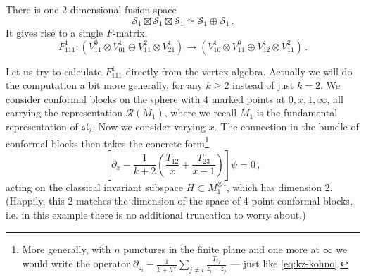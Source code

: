 \documentclass[12pt,letterpaper,reqno]{amsart}
\numberwithin{equation}{section}
\newcommand{\fsl}{{\mathfrak {sl}}}
\newcommand{\cS}{\ensuremath{\mathcal S}}
\newcommand{\vrep}{\mathcal{R}}
\begin{document}
\begin{example}
There is one 2-dimensional fusion space 
\begin{equation}
 \cS_1 \boxtimes \cS_1 \boxtimes \cS_1 \simeq \cS_1 \oplus \cS_1 \, . 
\end{equation}
It gives rise to a single $F$-matrix,
\begin{equation}
 F_{111}^1: (V_{11}^{0} \otimes V_{01}^1 \oplus V_{11}^2 \otimes V_{21}^1) \to (V_{10}^{1} \otimes V_{11}^0 \oplus V_{12}^1 \otimes V_{11}^2) \, .
\end{equation}

Let us try to calculate $F_{111}^1$ directly from the vertex algebra.
Actually we 
will do the computation a bit more generally, for any $k \ge 2$ instead
of just $k=2$.
We consider conformal blocks on the sphere with 4 marked points at
$0, x, 1, \infty$,
all carrying the representation $\vrep(M_1)$, where we recall $M_1$
is the fundamental representation of $\fsl_2$.
Now we consider varying $x$.
The connection in the bundle of conformal blocks then
takes the concrete form\footnote{More generally, with $n$ punctures in
the finite plane and one more at $\infty$ we would write the operator $\partial_{z_i} - \frac{1}{k + h^\vee} \sum_{j \neq i} \frac{T_{ij}}{z_i - z_j}$ --- just like \eqref{eq:kz-kohno}.}
\begin{equation} \label{eq:kz-4-punctures}
  \left[  \partial_{x} - \frac{1}{k+2} \left(  \frac{T_{12}}{x} + \frac{T_{23}}{x-1} \right) \right] \psi = 0 \, ,
\end{equation}
acting on the classical invariant subspace 
$H \subset M_1^{\otimes 4}$, which has dimension $2$.
(Happily, this $2$ matches the dimension of the space of 
$4$-point conformal blocks, i.e. in this example 
there is no additional truncation
to worry about.)


\end{example}
\end{document}
